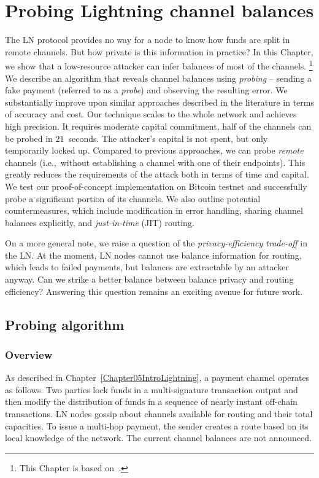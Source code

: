 \chapter{Probing Lightning channel balances}

\label{Chapter06LNprobing}

The LN protocol provides no way for a node to know how funds are split in remote channels.
But how private is this information in practice?
In this Chapter, we show that a low-resource attacker can infer balances of most of the channels.
\footnote{This Chapter is based on~\cite{Tikhomirov2020}.}
We describe an algorithm that reveals channel balances using \textit{probing} -- sending a fake payment (referred to as a \textit{probe}) and observing the resulting error.
We substantially improve upon similar approaches described in the literature in terms of accuracy and cost.
Our technique scales to the whole network and achieves high precision.
It requires moderate capital commitment, half of the channels can be probed in $21$~seconds.
The attacker's capital is not spent, but only temporarily locked up.
Compared to previous approaches, we can probe \textit{remote} channels (i.e.,~without establishing a channel with one of their endpoints).
This greatly reduces the requirements of the attack both in terms of time and capital.
We test our proof-of-concept implementation on Bitcoin testnet and successfully probe a significant portion of its channels.
We also outline potential countermeasures, which include modification in error handling, sharing channel balances explicitly, and \textit{just-in-time} (JIT) routing.

On a more general note, we raise a question of the \textit{privacy-efficiency trade-off} in the LN.
At the moment, LN nodes cannot use balance information for routing, which leads to failed payments, but balances are extractable by an attacker anyway.
Can we strike a better balance between balance privacy and routing efficiency?
Answering this question remains an exciting avenue for future work.


\section{Probing algorithm}
\label{sec:probing}

\subsection{Overview}

As described in Chapter~\ref{Chapter05IntroLightning}, a payment channel operates as follows.
Two parties lock funds in a multi-signature transaction output and then modify the distribution of funds in a sequence of nearly instant off-chain transactions.
LN nodes gossip about channels available for routing and their total capacities.
To issue a multi-hop payment, the sender creates a route based on its local knowledge of the network.
The current channel balances are not announced.

